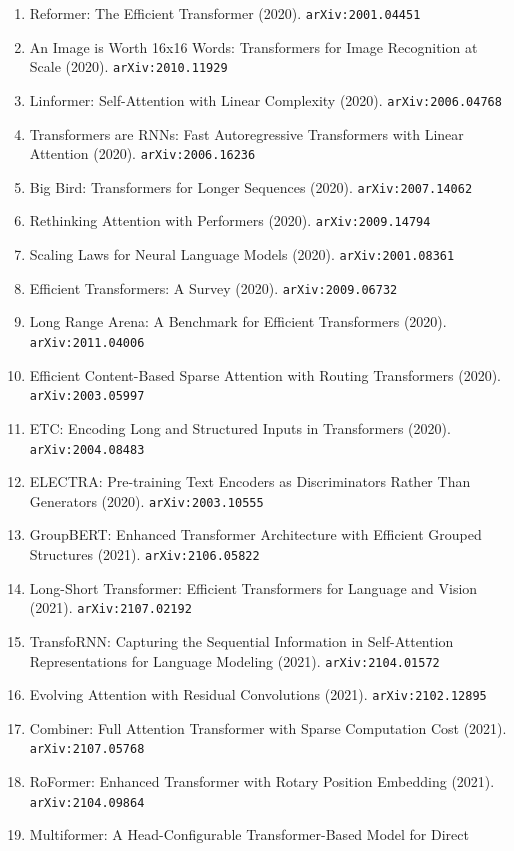 \documentclass[11pt]{article}
\begin{document}
\begin{enumerate}
  \item Reformer: The Efficient Transformer (2020). \texttt{arXiv:2001.04451}
  \item An Image is Worth 16x16 Words: Transformers for Image Recognition at
  Scale (2020). \texttt{arXiv:2010.11929}
  \item Linformer: Self-Attention with Linear Complexity (2020). \texttt{arXiv:2006.04768}
  \item Transformers are RNNs: Fast Autoregressive Transformers with Linear
  Attention (2020). \texttt{arXiv:2006.16236}
  \item Big Bird: Transformers for Longer Sequences (2020). \texttt{arXiv:2007.14062}
  \item Rethinking Attention with Performers (2020). \texttt{arXiv:2009.14794}
  \item Scaling Laws for Neural Language Models (2020). \texttt{arXiv:2001.08361}
  \item Efficient Transformers: A Survey (2020). \texttt{arXiv:2009.06732}
  \item Long Range Arena: A Benchmark for Efficient Transformers (2020). \texttt{arXiv:2011.04006}
  \item Efficient Content-Based Sparse Attention with Routing Transformers (2020). \texttt{arXiv:2003.05997}
  \item ETC: Encoding Long and Structured Inputs in Transformers (2020). \texttt{arXiv:2004.08483}
  \item ELECTRA: Pre-training Text Encoders as Discriminators Rather Than
  Generators (2020). \texttt{arXiv:2003.10555}
  \item GroupBERT: Enhanced Transformer Architecture with Efficient Grouped
  Structures (2021). \texttt{arXiv:2106.05822}
  \item Long-Short Transformer: Efficient Transformers for Language and Vision (2021). \texttt{arXiv:2107.02192}
  \item TransfoRNN: Capturing the Sequential Information in Self-Attention
  Representations for Language Modeling (2021). \texttt{arXiv:2104.01572}
  \item Evolving Attention with Residual Convolutions (2021). \texttt{arXiv:2102.12895}
  \item Combiner: Full Attention Transformer with Sparse Computation Cost (2021). \texttt{arXiv:2107.05768}
  \item RoFormer: Enhanced Transformer with Rotary Position Embedding (2021). \texttt{arXiv:2104.09864}
  \item Multiformer: A Head-Configurable Transformer-Based Model for Direct

\end{enumerate}
\end{document}
